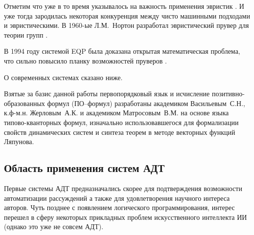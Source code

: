 Отметим что уже в то время указывалось на важность применения эвристик \cite{LogicComp}. И уже тогда зародилась некоторая конкуренция между чисто машинными подходами и эвристическими. В 1960-ые Л.М.~Нортон разработал эвристический прувер для теории групп \cite{LogicComp}.

В 1994 году системой EQP была доказана открытая математическая проблема, что сильно повысило планку возможностей пруверов \cite{McCuneRob}.

О современных системах сказано ниже.

Взятые за базис данной работы первопорядковый язык и исчисление позитивно-образованных формул (ПО--формул) разработаны академиком Васильевым~С.Н., к.ф-м.н. Жерловым~А.К. и академиком Матросовым~В.М. на основе языка типово-кванторных формул, изначально использовавшегося для формализации свойств динамических систем и синтеза теорем в методе векторных функций Ляпунова.





\subsection{Область применения систем АДТ}
Первые системы АДТ предназначались скорее для подтверждения возможности автоматизации рассуждений а также для удовлетворения научного интереса авторов. Чуть позднее с появлением логического программирования, интерес перешел в сферу некоторых прикладных проблем искусственного интеллекта ИИ (однако это уже не совсем АДТ).

